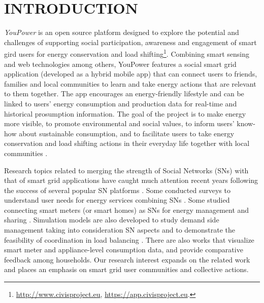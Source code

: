 \section{\uppercase{Introduction}}
\label{sec:introduction}

\noindent 
\textit{YouPower} is an open source platform designed to explore the potential and challenges of supporting social participation, awareness and engagement of smart gird users for energy conservation and load shifting\footnote{\url{http://www.civisproject.eu}, \url{https://app.civisproject.eu}.}. Combining smart sensing and web technologies among others,
YouPower features a social smart grid application (developed as a hybrid mobile app) that can connect users to friends, families and local communities to learn and take energy actions that are relevant to them together. The app encourages an energy-friendly lifestyle and can be linked to users' energy consumption and production data for real-time and historical prosumption information. 
% 
The goal of the project is to make energy more visible, to promote environmental and social values, to inform users' know-how about sustainable consumption, and to facilitate users to take energy conservation and load shifting actions in their everyday life together with local communities \cite{Huang2014,Huang2015c,Huang2016}. 
%  

Research topics related to merging the strength of Social Networks (SNs) with that of smart grid applications have caught much attention recent years following the success of several popular SN platforms \cite{Boslet2010,Chima2011,Erickson2012,Fang2013,Huang2015}. 
% 
Some conducted surveys to understand user needs for energy services combining SNs \cite{Silva2012}. Some studied connecting smart meters (or smart homes) as SNs for
energy management and sharing \cite{Ciuciu2012,Steinheimer2012}. 
Simulation models are also developed to study demand side management %
taking into consideration SN aspects \cite{De-Haan2011,Lei2012,Chatzidimitriou2013} and to demonstrate the feasibility of
coordination in load balancing \cite{Worm2013,Skopik2014}. There are also works that visualize smart meter and appliance-level consumption data, and provide comparative feedback among households\cite{Petkov2011,Weiss2012,Dillahunt2014}.
% 
Our research interest expands on the related work and places an emphasis on smart grid user communities and collective actions. 

